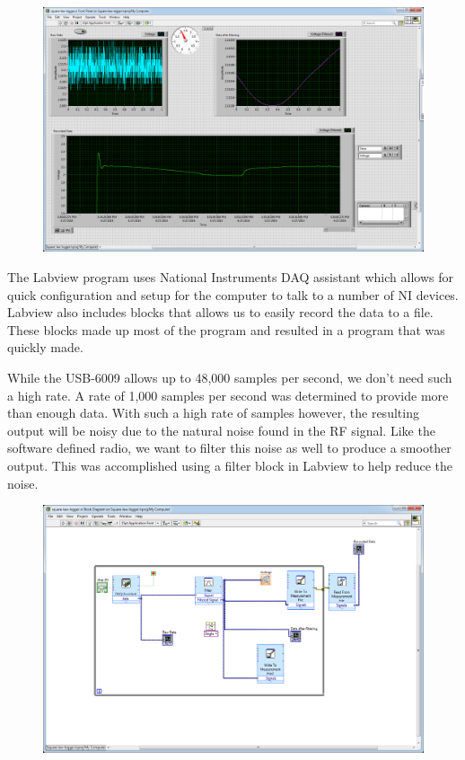 {\begin{figure}[h!tb] \centering
\includegraphics[width=\textwidth]{Images/labviewGUI.png}
\label{labviewgui}
\end{figure}
}

The Labview program uses National Instruments DAQ assistant which allows for quick configuration and setup for the computer to talk to a number of NI devices.  Labview also includes blocks that allows us to easily record the data to a file.  These blocks made up most of the program and resulted in a program that was quickly made.  

While the USB-6009 allows up to 48,000 samples per second, we don't need such a high rate.  A rate of 1,000 samples per second was determined to provide more than enough data.  With such a high rate of samples however, the resulting output will be noisy due to the natural noise found in the RF signal.  Like the software defined radio, we want to filter this noise as well to produce a smoother output.  This was accomplished using a filter block in Labview to help reduce the noise.

{\begin{figure}[h!tb] \centering
\includegraphics[width=\textwidth]{Images/labview-diagram.png}
\label{labviewblock}
\end{figure}
}

